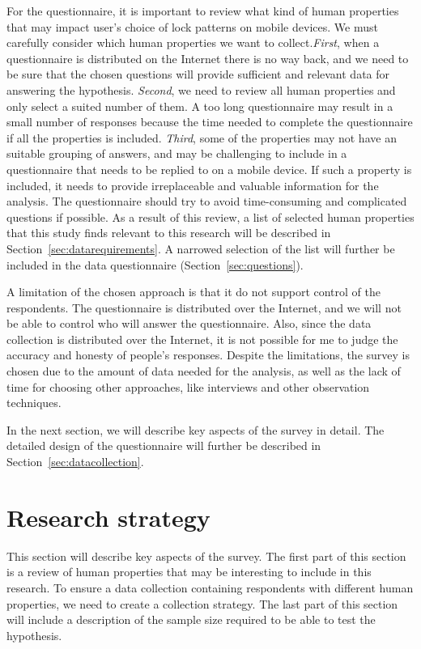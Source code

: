   For the questionnaire, it is important to review what kind of human properties that may impact user's choice of lock patterns on mobile devices. We must carefully consider which human properties we want to collect.{\it First}, when a questionnaire is distributed on the Internet there is no way back, and we need to be sure that the chosen questions will provide sufficient and relevant data for answering the hypothesis. {\it Second}, we need to review all human properties and only select a suited number of them. A too long questionnaire may result in a small number of responses because the time needed to complete the questionnaire if all the properties is included. {\it Third}, some of the properties may not have an suitable grouping of answers, and may be challenging to include in a questionnaire that needs to be replied to on a mobile device. If such a property is included, it needs to provide irreplaceable and valuable information for the analysis. The questionnaire should try to avoid time-consuming and complicated questions if possible. As a result of this review, a list of selected human properties that this study finds relevant to this research will be described in Section~\ref{sec:datarequirements}. A narrowed selection of the list will further be included in the data questionnaire (Section~\ref{sec:questions}).  
  
  A limitation of the chosen approach is that it do not support control of the respondents. The questionnaire is distributed over the Internet, and we will not be able to control who will answer the questionnaire. Also, since the data collection is distributed over the Internet, it is not possible for me to judge the accuracy and honesty of people's responses. Despite the limitations, the survey is chosen due to the amount of data needed for the analysis, as well as the lack of time for choosing other approaches, like interviews and other observation techniques. 
  
  In the next section, we will describe key aspects of the survey in detail. The detailed design of the questionnaire will further be described in Section~\ref{sec:datacollection}.

  \section{Research strategy}

  This section will describe key aspects of the survey. The first part of this section is a review of human properties that may be interesting to include in this research. To ensure a data collection containing respondents with different human properties, we need to create a collection strategy. The last part of this section will include a description of the sample size required to be able to test the hypothesis. 

